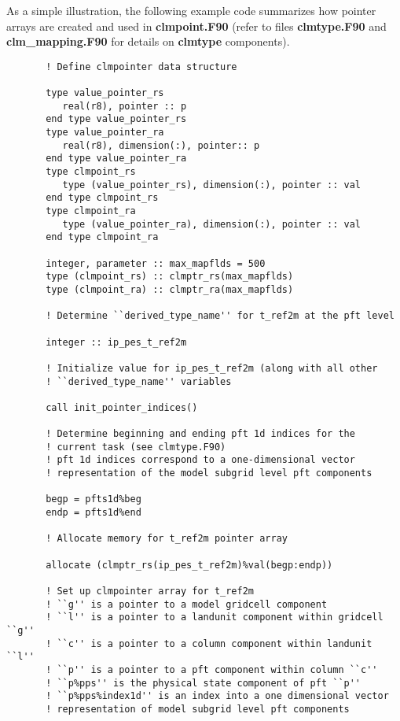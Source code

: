 As a simple illustration, the following example code summarizes how
pointer arrays are created and used in {\bf clmpoint.F90} (refer to
files {\bf clmtype.F90} and {\bf clm\_mapping.F90} for details on {\bf
clmtype} components).
\begin{verbatim}
       ! Define clmpointer data structure
     
       type value_pointer_rs
          real(r8), pointer :: p
       end type value_pointer_rs
       type value_pointer_ra
          real(r8), dimension(:), pointer:: p
       end type value_pointer_ra
       type clmpoint_rs
          type (value_pointer_rs), dimension(:), pointer :: val
       end type clmpoint_rs
       type clmpoint_ra
          type (value_pointer_ra), dimension(:), pointer :: val
       end type clmpoint_ra

       integer, parameter :: max_mapflds = 500
       type (clmpoint_rs) :: clmptr_rs(max_mapflds)
       type (clmpoint_ra) :: clmptr_ra(max_mapflds)
            
       ! Determine ``derived_type_name'' for t_ref2m at the pft level
     
       integer :: ip_pes_t_ref2m 

       ! Initialize value for ip_pes_t_ref2m (along with all other
       ! ``derived_type_name'' variables

       call init_pointer_indices()
     
       ! Determine beginning and ending pft 1d indices for the
       ! current task (see clmtype.F90)
       ! pft 1d indices correspond to a one-dimensional vector 
       ! representation of the model subgrid level pft components
     
       begp = pfts1d%beg
       endp = pfts1d%end
     
       ! Allocate memory for t_ref2m pointer array
     
       allocate (clmptr_rs(ip_pes_t_ref2m)%val(begp:endp))
     
       ! Set up clmpointer array for t_ref2m
       ! ``g'' is a pointer to a model gridcell component
       ! ``l'' is a pointer to a landunit component within gridcell ``g''	
       ! ``c'' is a pointer to a column component within landunit ``l''	
       ! ``p'' is a pointer to a pft component within column ``c''	
       ! ``p%pps'' is the physical state component of pft ``p''
       ! ``p%pps%index1d'' is an index into a one dimensional vector
       ! representation of model subgrid level pft components 
     

\end{verbatim}
